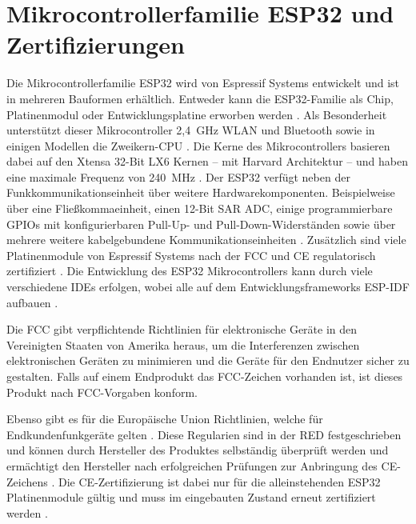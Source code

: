 
\section{Mikrocontrollerfamilie ESP32 und Zertifizierungen}
\label{section:esp32Explained}
Die Mikrocontrollerfamilie ESP32 wird von Espressif Systems entwickelt und ist in mehreren Bauformen erhältlich. Entweder kann die ESP32-Familie als Chip, Platinenmodul oder Entwicklungsplatine erworben werden \cites{espressifModules}{espressifDevKit}{espressifSoC}. Als Besonderheit unterstützt dieser Mikrocontroller 2,4~GHz \acs{WLAN} und Bluetooth sowie in einigen Modellen die Zweikern-\acs{CPU} \cites{espressifGetStarted}[S.~8]{espressifTechnicalReference}[S.~24]{espressifTechnicalReference}. Die Kerne des Mikrocontrollers basieren dabei auf den Xtensa 32-Bit LX6 Kernen -- mit Harvard Architektur -- und haben eine maximale Frequenz von 240~MHz \cites{espressifGetStarted}[S.~9]{espressifTechnicalReference}[S.~8]{espressifTechnicalReference}[S.~24]{espressifTechnicalReference}. Der ESP32 verfügt neben der Funkkommunikationseinheit über weitere Hardwarekomponenten. Beispielweise über eine Fließkommaeinheit, einen 12-Bit \ac{SAR} \ac{ADC}, einige programmierbare \acfp{GPIO} mit konfigurierbaren Pull-Up- und Pull-Down-Widerständen sowie über mehrere weitere kabelgebundene Kommunikationseinheiten \cites[S.~10f.]{espressifTechnicalReference}[S.~23]{espressifTechnicalReference}[S.~34]{espressifTechnicalReference}. Zusätzlich sind viele Platinenmodule von Espressif Systems nach der  \ac{FCC} \cite{fccApproval} und \ac{CE} regulatorisch zertifiziert \cite{espressifCertificates}. Die Entwicklung des ESP32 Mikrocontrollers kann durch viele verschiedene \acfp{IDE} erfolgen, wobei alle auf dem Entwicklungsframeworks \ac{ESP-IDF} aufbauen \cites{espressifGetStarted}{espressifIDF}. 

Die \ac{FCC} gibt verpflichtende Richtlinien für elektronische Geräte in den Vereinigten Staaten von Amerika heraus, um die Interferenzen zwischen elektronischen Geräten zu minimieren und die Geräte für den Endnutzer sicher zu gestalten. Falls auf einem Endprodukt das \ac{FCC}-Zeichen vorhanden ist, ist dieses Produkt nach \ac{FCC}-Vorgaben konform. \cite{fccApproval}

Ebenso gibt es für die Europäische Union Richtlinien, welche für Endkundenfunkgeräte gelten \cites{europeanCEMarking}{europeanRED}. Diese Regularien sind in der \ac{RED} festgeschrieben und können durch Hersteller des Produktes selbständig überprüft werden und ermächtigt den Hersteller nach erfolgreichen Prüfungen zur Anbringung des \ac{CE}-Zeichens \cite[S.~14]{europeanFunkanalagen}. Die \ac{CE}-Zertifizierung ist dabei nur für die alleinstehenden ESP32 Platinenmodule gültig und muss im eingebauten Zustand erneut zertifiziert werden \cite{naumannCE}.

